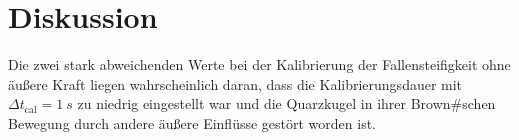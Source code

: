 \newpage
\section{Diskussion}
\label{sec:conclusion}

Die zwei stark abweichenden Werte bei der Kalibrierung der Fallensteifigkeit ohne äußere Kraft liegen wahrscheinlich daran, dass die Kalibrierungsdauer mit $\Delta t_{\mathrm{cal}} = \qty{1}{s}$ zu niedrig eingestellt war und die Quarzkugel in ihrer Brown#schen Bewegung durch andere äußere Einflüsse gestört worden ist.